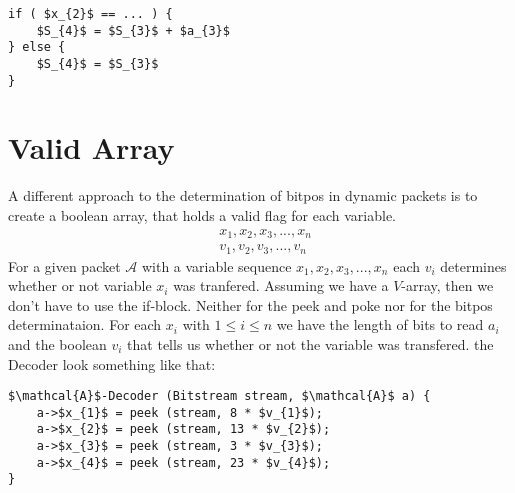 \documentclass[paper=a4,DIV=12]{scrartcl}
\begin{document}
		\begin{lstlisting}[mathescape]
if ( $x_{2}$ == ... ) {
	$S_{4}$ = $S_{3}$ + $a_{3}$
} else {
	$S_{4}$ = $S_{3}$
}
		\end{lstlisting}

	\section{Valid Array}
		A different approach to the determination of bitpos in dynamic packets is to create a boolean array, that holds a valid flag for each variable.
		\begin{align*}
			&x_{1}, x_{2}, x_{3}, ... , x_{n}\\
			&v_{1}, v_{2}, v_{3}, ... , v_{n}	
		\end{align*}
		For a given packet $\mathcal{A}$ with a variable sequence $x_{1}, x_{2}, x_{3}, ... , x_{n}$ each $v_{i}$ determines whether or not variable $x_{i}$ was tranfered.
		Assuming we have a $V$-array, then we don't have to use the if-block. Neither for the peek and poke nor for the bitpos determinataion.
		For each $x_{i}$ with $1\leq i\leq n$ we have the length of bits to read $a_{i}$ and the boolean $v_{i}$ that tells us whether or not the variable was transfered.
		the Decoder look something like that:
		\begin{lstlisting}[mathescape]
$\mathcal{A}$-Decoder (Bitstream stream, $\mathcal{A}$ a) {
	a->$x_{1}$ = peek (stream, 8 * $v_{1}$);
	a->$x_{2}$ = peek (stream, 13 * $v_{2}$);
	a->$x_{3}$ = peek (stream, 3 * $v_{3}$);
	a->$x_{4}$ = peek (stream, 23 * $v_{4}$);
}
		\end{lstlisting}
\end{document}
